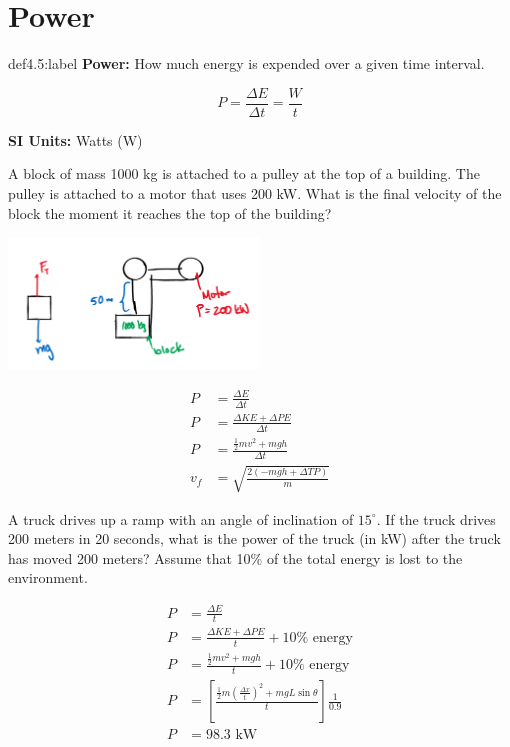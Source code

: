 \section{Power}

\begin{definition}[Power]{def4.5:label}
    \textbf{Power:} How much energy is expended over a given time interval.

    $$
    P = \frac{\Delta E}{\Delta t} = \frac{W}{t}
    $$

    \textbf{SI Units:} Watts (W)
\end{definition}


\begin{problem}
    A block of mass 1000 kg is attached to a pulley at the top of a building. The pulley is attached to a motor that uses 200 kW. What is the final velocity of the block the moment it reaches the top of the building?

    \begin{center}
        \includegraphics[width=0.5\textwidth]{chapters/ch4/images/fig4_8}
    \end{center}

    $$
    \begin{aligned}
        P &= \frac{\Delta E}{\Delta t}\\
        P &= \frac{\Delta KE + \Delta PE}{\Delta t}\\
        P &= \frac{\frac{1}{2}mv^2+mgh}{\Delta t}\\
        v_f &= \sqrt{\frac{2(-mgh+\Delta T P)}{m}}
    \end{aligned}
    $$
\end{problem}


\begin{problem}
    A truck drives up a ramp with an angle of inclination of $15^\circ$. If the truck drives 200 meters in 20 seconds, what is the power of the truck (in kW) after the truck has moved 200 meters? Assume that 10\% of the total energy is lost to the environment.

    $$
    \begin{aligned}
        P &= \frac{\Delta E}{t}\\
        P &= \frac{\Delta KE + \Delta PE}{t}+ 10\%\text{ energy}\\
        P &= \frac{\frac{1}{2}mv^2 + mgh}{t} + 10\%\text{ energy}\\
        P &= \left[\frac{\frac{1}{2}m\left(\frac{\Delta x}{t}\right)^2 + mgL\sin\theta}{t}\right]\frac{1}{0.9}\\
        P &= 98.3 \text{ kW}
    \end{aligned}
    $$
\end{problem}